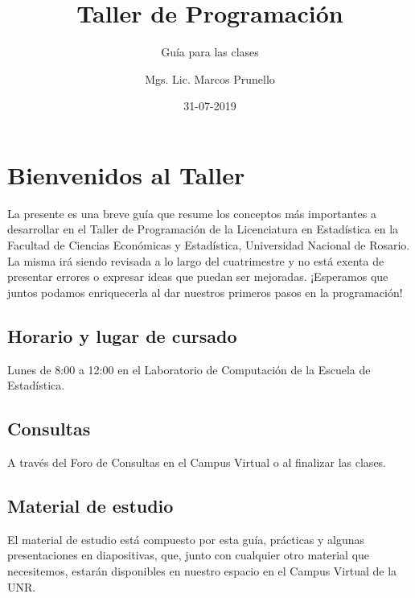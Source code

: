 \documentclass[]{book}
\title{Taller de Programación}
\subtitle{Guía para las clases}
\author{Mgs. Lic. Marcos Prunello}
\date{31-07-2019}
\begin{document}
\maketitle

{
\setcounter{tocdepth}{1}
\tableofcontents
}
\hypertarget{bienvenidos-al-taller}{%
\chapter{Bienvenidos al Taller}\label{bienvenidos-al-taller}}

La presente es una breve guía que resume los conceptos más importantes a desarrollar en el Taller de Programación de la Licenciatura en Estadística en la Facultad de Ciencias Económicas y Estadística, Universidad Nacional de Rosario. La misma irá siendo revisada a lo largo del cuatrimestre y no está exenta de presentar errores o expresar ideas que puedan ser mejoradas. ¡Esperamos que juntos podamos enriquecerla al dar nuestros primeros pasos en la programación!

\hypertarget{horario-y-lugar-de-cursado}{%
\section*{Horario y lugar de cursado}\label{horario-y-lugar-de-cursado}}

Lunes de 8:00 a 12:00 en el Laboratorio de Computación de la Escuela de Estadística.

\hypertarget{consultas}{%
\section*{Consultas}\label{consultas}}

A través del Foro de Consultas en el Campus Virtual o al finalizar las clases.

\hypertarget{material-de-estudio}{%
\section*{Material de estudio}\label{material-de-estudio}}

El material de estudio está compuesto por esta guía, prácticas y algunas presentaciones en diapositivas, que, junto con cualquier otro material que necesitemos, estarán disponibles en nuestro espacio en el Campus Virtual de la UNR.
\end{document}
